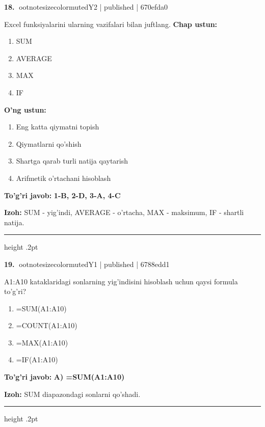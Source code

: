 \documentclass[10pt,a4paper]{article}
\begin{document}
\textbf{\color{ink}18.} {ootnotesizecolor{muted}Y2 | published | 670efda0}
\par
Excel funksiyalarini ularning vazifalari bilan juftlang.
\textbf{Chap ustun:}\begin{enumerate}[label=\arabic*),leftmargin=9mm]
\item SUM
\item AVERAGE
\item MAX
\item IF
\end{enumerate}
\textbf{O'ng ustun:}\begin{enumerate}[label=\Alph*),leftmargin=9mm]
\item Eng katta qiymatni topish
\item Qiymatlarni qo'shish
\item Shartga qarab turli natija qaytarish
\item Arifmetik o'rtachani hisoblash
\end{enumerate}
\begin{tcolorbox}[enhanced,breakable,colback=teal!4,colframe=teal!55!black,boxrule=0.45pt,arc=1.2mm,left=2.8mm,right=2.8mm,top=2mm,bottom=2mm]
\textbf{\color{teal}To'g'ri javob:} \textbf{1-B, 2-D, 3-A, 4-C}
\par\smallskip
\textbf{Izoh:} SUM - yig'indi, AVERAGE - o'rtacha, MAX - maksimum, IF - shartli natija.
\end{tcolorbox}
\vspace{2mm}\hrule height .2pt\vspace{2mm}

\textbf{\color{ink}19.} {ootnotesizecolor{muted}Y1 | published | 6788edd1}
\par
A1:A10 kataklaridagi sonlarning yig'indisini hisoblash uchun qaysi formula to'g'ri?
\begin{enumerate}[label=\Alph*),leftmargin=9mm]
\item =SUM(A1:A10)
\item =COUNT(A1:A10)
\item =MAX(A1:A10)
\item =IF(A1:A10)
\end{enumerate}
\begin{tcolorbox}[enhanced,breakable,colback=teal!4,colframe=teal!55!black,boxrule=0.45pt,arc=1.2mm,left=2.8mm,right=2.8mm,top=2mm,bottom=2mm]
\textbf{\color{teal}To'g'ri javob:} \textbf{A) =SUM(A1:A10)}
\par\smallskip
\textbf{Izoh:} SUM diapazondagi sonlarni qo'shadi.
\end{tcolorbox}
\vspace{2mm}\hrule height .2pt\vspace{2mm}
\end{document}
